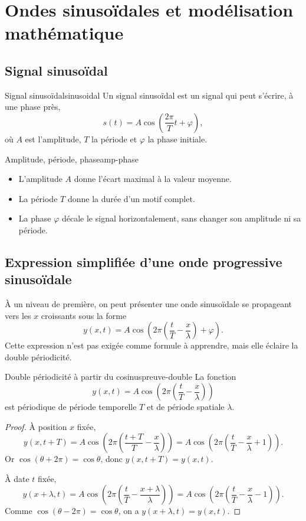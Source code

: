 \documentclass[11pt,a4paper]{article}
\begin{document}
\section{Ondes sinusoïdales et modélisation mathématique}

\subsection{Signal sinusoïdal}

\begin{definitionbox}{Signal sinusoïdal}{sinusoidal}
Un signal sinusoïdal est un signal qui peut s'écrire, à une phase près,
\[
s(t)=A\cos\left(\frac{2\pi}{T}t+\varphi\right),
\]
où $A$ est l'amplitude, $T$ la période et $\varphi$ la phase initiale.
\end{definitionbox}

\begin{retenirbox}{Amplitude, période, phase}{amp-phase}
\begin{itemize}
  \item L'amplitude $A$ donne l'écart maximal à la valeur moyenne.
  \item La période $T$ donne la durée d'un motif complet.
  \item La phase $\varphi$ décale le signal horizontalement, sans changer son amplitude ni sa période.
\end{itemize}
\end{retenirbox}

\subsection{Expression simplifiée d'une onde progressive sinusoïdale}

À un niveau de première, on peut présenter une onde sinusoïdale se propageant vers les $x$ croissants sous la forme
\[
y(x,t)=A\cos\left(2\pi\left(\frac{t}{T}-\frac{x}{\lambda}\right)+\varphi\right).
\]
Cette expression n'est pas exigée comme formule à apprendre, mais elle éclaire la double périodicité.

\begin{propositionbox}{Double périodicité à partir du cosinus}{preuve-double}
La fonction
\[
y(x,t)=A\cos\left(2\pi\left(\frac{t}{T}-\frac{x}{\lambda}\right)\right)
\]
est périodique de période temporelle $T$ et de période spatiale $\lambda$.
\end{propositionbox}

\begin{proof}
À position $x$ fixée,
\[
y(x,t+T)=A\cos\left(2\pi\left(\frac{t+T}{T}-\frac{x}{\lambda}\right)\right)
=A\cos\left(2\pi\left(\frac{t}{T}-\frac{x}{\lambda}+1\right)\right).
\]
Or $\cos(\theta+2\pi)=\cos\theta$, donc $y(x,t+T)=y(x,t)$.

À date $t$ fixée,
\[
y(x+\lambda,t)=A\cos\left(2\pi\left(\frac{t}{T}-\frac{x+\lambda}{\lambda}\right)\right)
=A\cos\left(2\pi\left(\frac{t}{T}-\frac{x}{\lambda}-1\right)\right).
\]
Comme $\cos(\theta-2\pi)=\cos\theta$, on a $y(x+\lambda,t)=y(x,t)$.
\end{proof}
\end{document}
